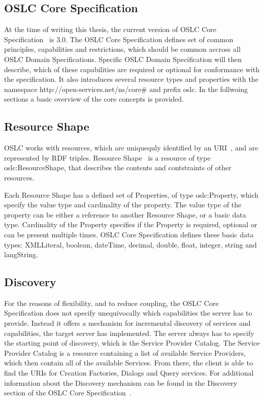 \subsection{OSLC Core Specification}
At the time of writing this thesis, the current version of OSLC Core Specification \cite{oslc_core_specification} is 3.0. The OSLC Core Specification defines set of common principles, capabilities and restrictions, which should be common accross all OSLC Domain Specifications. Specific OSLC Domain Specification will then describe, which of these capabilities are required or optional for conformance with the specification. It also introduces several resource types and properties with the namespace http://open-services.net/ns/core\# and prefix oslc. In the follwoing sections a basic overview of the core concepts is provided.

\subsection*{Resource Shape}
OSLC works with resources, which are uniquequly identified by an URI \cite{uri_rfc}, and are represented by RDF triples. Resource Shape \cite{oslc_core_resource_shape} is a resource of type oslc:ResourceShape, that describes the contents and contstraints of other resources.


Each Resource Shape has a defined set of Properties, of type oslc:Property, which specify the value type and cardinality of the property. The value type of the property can be either a reference to another Resource Shape, or a basic data type. Cardinality of the Property specifies if the Property is required, optional or can be present multiple times. OSLC Core Specification defines these basic data types: XMLLiteral, boolean, dateTime, decimal, double, float, integer, string and langString.

\subsection*{Discovery}
For the reasons of flexibility, and to reduce coupling, the OSLC Core Specification does not specify unequivocally which capabilities the server has to provide. Instead it offers a mechanism for incremental discovery of services and capabilities, the target server has implemented.
The server always has to specify the starting point of discovery, which is the Service Provider Catalog. The Service Provider Catalog is a resource containing a list of available Service Providers, which then contain all of the available Services. From there, the client is able to find the URIs for Creation Factories, Dialogs and Query services. For additional information about the Discovery mechanism can be found in the Discovery section of the OSLC Core Specification \cite{oslc_core_discovery}.

